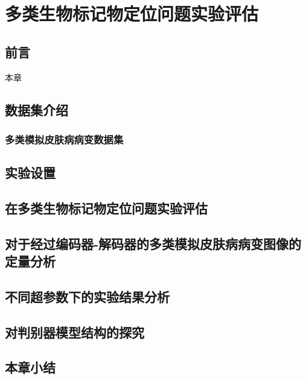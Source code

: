 \chapter{多类生物标记物定位问题实验评估}\label{sec:multi_classes}
\section{前言}
本章
\section{数据集介绍}
\subsection{多类模拟皮肤病病变数据集}
\section{实验设置}
\section{在多类生物标记物定位问题实验评估}
\section{对于经过编码器-解码器的多类模拟皮肤病病变图像的定量分析}
\section{不同超参数下的实验结果分析}
\section{对判别器模型结构的探究}
\section{本章小结}
